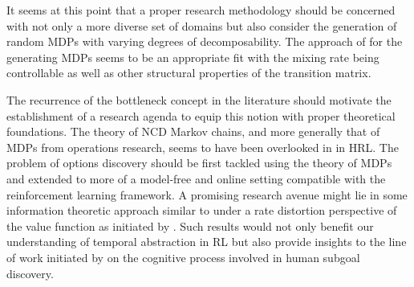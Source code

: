It seems at this point that a proper research methodology should be concerned with not only a more diverse set of domains but also consider the generation of random MDPs with varying degrees of decomposability. The approach of \cite{Archibald1995} for the generating MDPs seems to be an appropriate fit with the mixing rate being controllable as well as other structural properties of the transition matrix. 

The recurrence of the bottleneck concept in the literature should motivate the establishment of a research agenda to equip this notion with proper theoretical foundations. The theory of NCD Markov chains, and more generally that of MDPs from operations research, seems to have been overlooked in in HRL. The problem of options discovery should be first tackled using the theory of MDPs and extended to more of a model-free and online setting compatible with the reinforcement learning framework. A promising research avenue might lie in some information theoretic approach similar to \cite{Deng2011} under a rate distortion perspective of the value function as initiated by \cite{Still2012}. Such results would not only benefit our understanding of temporal abstraction in RL but also provide insights to the line of work initiated by \cite{Botvinick2012} on the cognitive process involved in human subgoal discovery.
